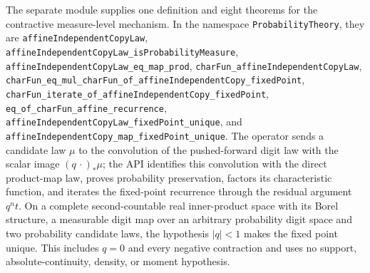 \documentclass[11pt,oneside]{article}
\theoremstyle{definition}
\theoremstyle{remark}
\newcommand{\1}{\mathbf 1}
\begin{document}
\begin{statusbox}
The separate module  supplies one definition and eight
theorems for the contractive measure-level mechanism.  In the namespace
\nolinkurl{ProbabilityTheory}, they are
\nolinkurl{affineIndependentCopyLaw},
\nolinkurl{affineIndependentCopyLaw_isProbabilityMeasure},
\nolinkurl{affineIndependentCopyLaw_eq_map_prod},
\nolinkurl{charFun_affineIndependentCopyLaw},
\nolinkurl{charFun_eq_mul_charFun_of_affineIndependentCopy_fixedPoint},
\nolinkurl{charFun_iterate_of_affineIndependentCopy_fixedPoint},
\nolinkurl{eq_of_charFun_affine_recurrence},
\nolinkurl{affineIndependentCopyLaw_fixedPoint_unique}, and
\nolinkurl{affineIndependentCopy_map_fixedPoint_unique}.
The operator sends a candidate law \(\mu\) to the convolution of the pushed-forward digit
law with the scalar image \((q\,\cdot)_*\mu\); the API identifies this convolution with the
direct product-map law, proves probability preservation, factors its characteristic
function, and iterates the fixed-point recurrence through the residual argument
\(q^n t\).  On a complete second-countable real inner-product space with its Borel
structure, a measurable digit map over an arbitrary probability digit space and two
probability candidate laws, the hypothesis \(|q|<1\) makes the fixed point unique.  This
includes \(q=0\) and every negative contraction and uses no support, absolute-continuity,
density, or moment hypothesis.


\end{statusbox}
\end{document}
